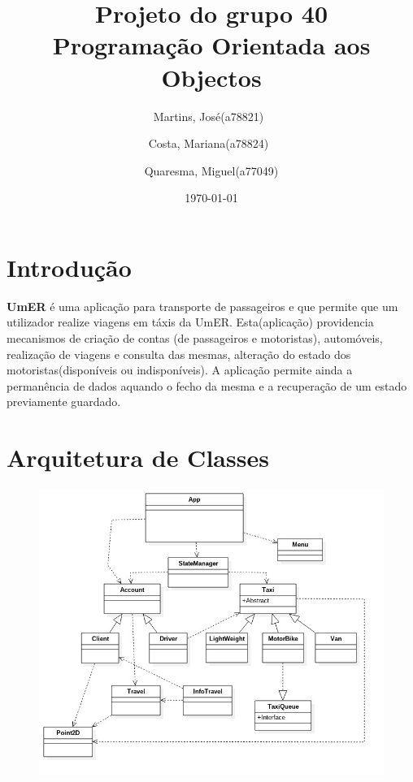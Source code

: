 \documentclass[a4paper,10pt,portuguese]{article}
\title{Projeto do grupo 40 \\ Programação Orientada aos Objectos}
\author{Martins, José(a78821)\
        \and
        Costa, Mariana(a78824)\
        \and
        Quaresma, Miguel(a77049)
        }
\date{\today}
\begin{document}
\begin{titlepage}
\maketitle
\end{titlepage}
 
\tableofcontents

\newpage

\section{Introdução}
\textbf{UmER} é uma aplicação para transporte de passageiros e que permite que um utilizador realize viagens em táxis da UmER. Esta(aplicação) providencia mecanismos de criação de contas (de passageiros e motoristas), automóveis, realização de viagens e consulta das mesmas, alteração do estado dos motoristas(disponíveis ou indisponíveis). A aplicação permite ainda a permanência de dados aquando o fecho da mesma e a recuperação de um estado previamente guardado.

\newpage 

\section{Arquitetura de Classes}

\begin{figure}[ht!]
    \centering
        \includegraphics[width=120mm]{graph.jpg}
\end{figure}
\end{document}
